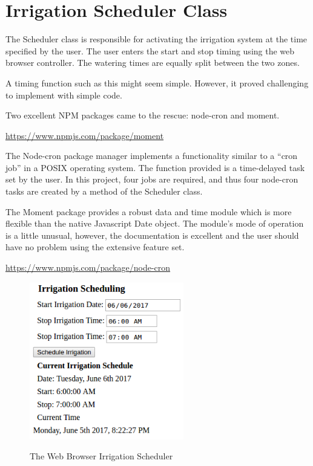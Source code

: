 %
%
%

\chapter{Irrigation Scheduler Class}

The Scheduler class is responsible for activating the irrigation system at the 
time specified by the user.  The user enters the start and stop timing using 
the web browser controller.  The watering times are equally split between the 
two zones.

A timing function such as this might seem simple.  However, it proved 
challenging to implement with simple code.

Two excellent NPM packages came to the rescue: node-cron and moment.

\url{https://www.npmjs.com/package/moment}

The Node-cron package manager implements a functionality similar to a ``cron 
job'' in a POSIX operating system.  The function provided is a time-delayed 
task set by the user.  In this project, four jobs are required, and thus four 
node-cron tasks are created by a method of the Scheduler class.

The Moment package provides a robust data and time module which is more 
flexible than the native Javascript Date object.  The module's mode of 
operation is a little unusual, however, the documentation is excellent and the 
user should have no problem using the extensive feature set.

\url{https://www.npmjs.com/package/node-cron}

\begin{figure}[H]
	\centering
	\includegraphics[width=0.6\textwidth]{photos/scheduler.png}
	\centering\bfseries
	\caption{The Web Browser Irrigation Scheduler}
\end{figure}

